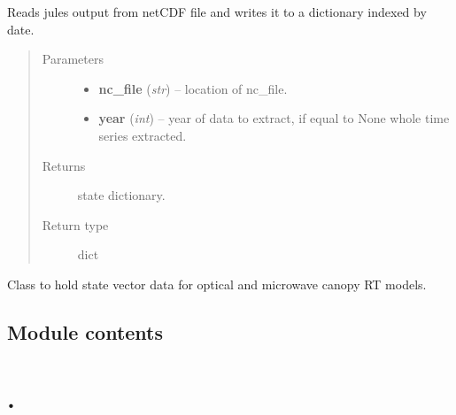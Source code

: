 \documentclass[letterpaper,10pt,english]{sphinxmanual}
\begin{document}
\begin{fulllineitems}
\label{source/sentinelSimulator:sentinelSimulator.stateVector.read_jules}
Reads jules output from netCDF file and writes it to a dictionary indexed by date.
\begin{quote}\begin{description}
\item[{Parameters}] \leavevmode\begin{itemize}
\item {} 
\textbf{nc\_file} (\emph{str}) -- location of nc\_file.

\item {} 
\textbf{year} (\emph{int}) -- year of data to extract, if equal to None whole time series extracted.

\end{itemize}

\item[{Returns}] \leavevmode
state dictionary.

\item[{Return type}] \leavevmode
dict

\end{description}\end{quote}

\end{fulllineitems}


\begin{fulllineitems}
\label{source/sentinelSimulator:sentinelSimulator.stateVector.stateVector}
Class to hold state vector data for optical
and microwave canopy RT models.

\end{fulllineitems}



\subsection{Module contents}
\label{source/sentinelSimulator:module-sentinelSimulator}\label{source/sentinelSimulator:module-contents}

\section{.}
\label{source/modules::doc}\label{source/modules:id1}
\end{document}
